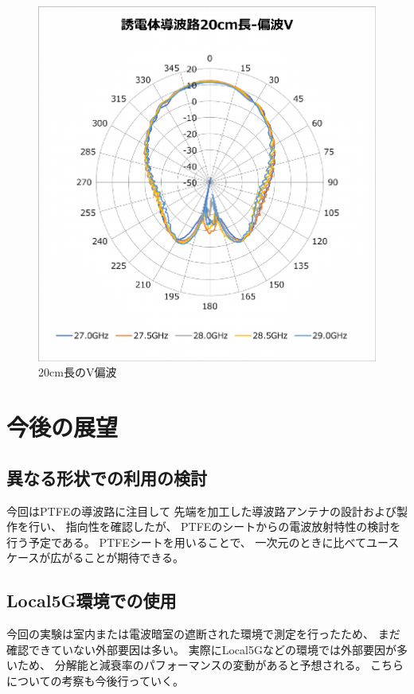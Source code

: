 \documentclass[technicalreport]{ieicej}
\begin{document}
\begin{figure}[tb]
  \begin{center}
    \includegraphics[bb=0 0 408 430, width=0.9\linewidth]{img/waveguide-20cm-v.pdf}
    \caption{20cm長のV偏波}
    \label{fig:20cm-v}
  \end{center}
\end{figure}

\section{今後の展望}

\subsection{異なる形状での利用の検討}

今回はPTFEの導波路に注目して
先端を加工した導波路アンテナの設計および製作を行い、
指向性を確認したが、
PTFEのシートからの電波放射特性の検討を行う予定である。
PTFEシートを用いることで、
一次元のときに比べてユースケースが広がることが期待できる。

\subsection{Local5G環境での使用}

今回の実験は室内または電波暗室の遮断された環境で測定を行ったため、
まだ確認できていない外部要因は多い。
実際にLocal5Gなどの環境では外部要因が多いため、
分解能と減衰率のパフォーマンスの変動があると予想される。
こちらについての考察も今後行っていく。
\end{document}
